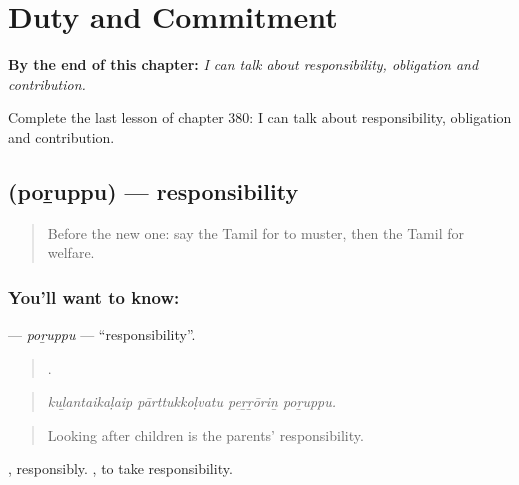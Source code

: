 
\chapter{Duty and Commitment}
\label{ch:ta-duty-and-commitment}

\begin{chapteropening}
\textbf{By the end of this chapter:} \emph{I can talk about responsibility, obligation and contribution.}

Complete the last lesson of chapter 380: I can talk about responsibility, obligation and contribution.
\end{chapteropening}

\section[\texorpdfstring{\ta{பொறுப்பு} (poṟuppu)}{பொறுப்பு (poṟuppu)}]{ (poṟuppu) — responsibility}

\label{lesson:TA-C380-poruppu}



\begin{quote}
Before the new one: say the Tamil for to muster, then the Tamil for welfare.
\end{quote}

\subsection*{You'll want to know: }
\textbf{} — \emph{poṟuppu} — \textquotedblleft{}responsibility\textquotedblright{}.

\begin{quote}
   .
\end{quote}

\begin{quote}
\emph{kuḻantaikaḷaip pārttukkoḷvatu peṟṟōriṉ poṟuppu.}
\end{quote}

\begin{quote}
Looking after children is the parents' responsibility.
\end{quote}

, responsibly. , to take responsibility.

